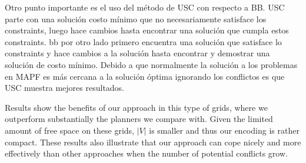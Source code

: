  Otro punto importante es el uso del método de USC con respecto a BB. USC parte con una solución costo mínimo que no necesariamente satisface los constraints, luego hace cambios hasta encontrar una solución que cumpla estos constraints. bb por otro lado primero encuentra una solución que satisface lo constraints y hace cambios a la solución hasta encontrar y demostrar una solución de costo mínimo. Debido a que normalmente la solución a los problemas en MAPF es más cercana a la solución óptima ignorando los conflictos es que USC muestra mejores resultados.


Results show the benefits of our approach in this type of grids, where we outperform substantially the planners we compare with. Given the limited amount of free space on these grids, $|V|$ is smaller and thus our encoding is rather compact. These results also illustrate that our approach can cope nicely and more effectively than other approaches when the number of potential conflicts grow.
